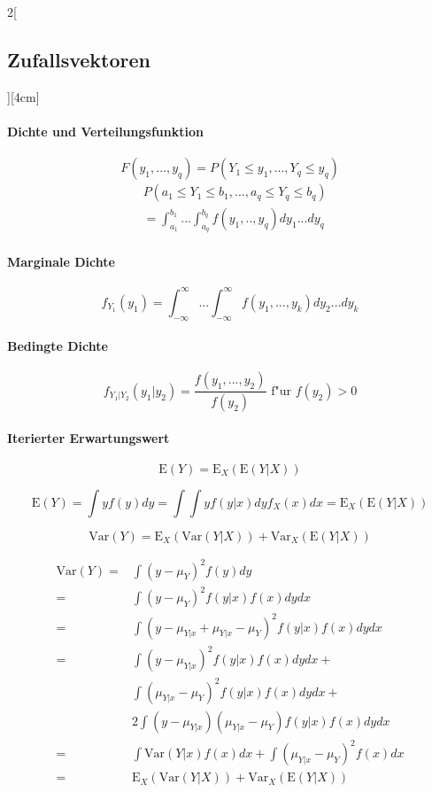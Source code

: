\documentclass[8pt]{extarticle}
\begin{document}
\begin{multicols}{2}[\subsection{Zufallsvektoren}][4cm]

\paragraph{Dichte und Verteilungsfunktion}

$$F(y_1, ..., y_q) = P(Y_1 \leq y_1, ..., Y_q \leq y_q)$$
\begin{align*}
& P(a_1 \leq Y_1 \leq b_1, ..., a_q \leq Y_q \leq b_q) \\
& = \int_{a_1}^{b_1} ...\int_{a_q}^{b_q} f(y_1, .., y_q)dy_1...dy_q
\end{align*}

\paragraph{Marginale Dichte}

$$f_{Y_1}(y_1) = \int_{-\infty}^{\infty}...\int_{-\infty}^{\infty} f(y_1,...,y_k)dy_2...dy_k$$

\paragraph{Bedingte Dichte}

$$f_{Y_1|Y_2}(y_1|y_2) = \frac{f(y_1, ..., y_2)}{f(y_2)} \text{ f"ur } f(y_2) > 0$$

\paragraph{Iterierter Erwartungswert}

$$\mathrm{E}(Y)=\mathrm{E}_X(\mathrm{E}(Y|X))$$
\begin{Beweis}
$$\mathrm{E}(Y) = \int yf(y)dy = \int\int y f(y|x)dy f_X(x)dx = \mathrm{E}_X(\mathrm{E}(Y|X))$$
\end{Beweis}
$$\mathrm{Var}(Y) = \mathrm{E}_X(\mathrm{Var}(Y|X)) + \mathrm{Var}_X(\mathrm{E}(Y|X))$$
\begin{Beweis}
\begin{align*}
\mathrm{Var}(Y) =&  \int (y- \mu_Y)^2 f(y)dy\\
=& \int (y- \mu_Y)^2 f(y|x)f(x)dydx\\
=& \int (y- \mu_{Y|x} + \mu_{Y|x} - \mu_Y)^2 f(y|x)f(x)dydx\\
=& \int (y- \mu_{Y|x})^2 f(y|x)f(x)dydx + \\
 & \int (\mu_{Y|x} - \mu_Y)^2 f(y|x)f(x)dydx + \\
 & 2 \int (y- \mu_{Y|x})(\mu_{Y|x} - \mu_Y) f(y|x)f(x)dydx \\
=& \int \mathrm{Var}(Y|x)f(x)dx + \int (\mu_{Y|x} - \mu_Y)^2f(x)dx\\
=& \mathrm{E}_X(\mathrm{Var}(Y|X)) + \mathrm{Var}_X(\mathrm{E}(Y|X))
\end{align*}
\end{Beweis}

\end{multicols}
\end{document}
